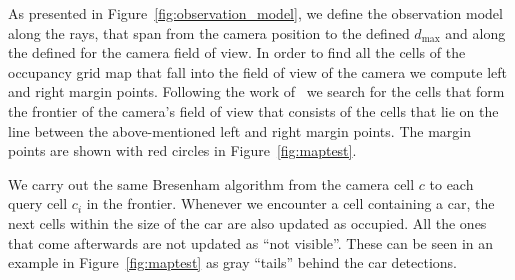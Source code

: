 \begin{figure}[t]%
\centering
{}\hspace{2mm}
\caption{}
\end{figure}

As presented in Figure~\ref{fig:observation_model}, we define the observation
model along the rays, that span from the camera position to the defined
$d_{\max}$ and along the defined for the camera field of view. In order to
find all the cells of the occupancy grid map that fall into the field of view
of the camera we compute left and right margin points. Following the work
of~\citet{bresenham1965} we search for the cells that form the frontier of the
camera's field of view that consists of the cells that lie on the line between
the above-mentioned left and right margin points. The margin points are shown
with red circles in Figure~\ref{fig:maptest}.

We carry out the same Bresenham algorithm from the camera cell $c$ to each
query cell $c_i$ in the frontier. Whenever we encounter a cell containing a
car, the next cells within the size of the car are also updated as occupied.
All the ones that come afterwards are not updated as ``not visible''. These
can be seen in an example in Figure~\ref{fig:maptest} as gray ``tails'' behind
the car detections.

